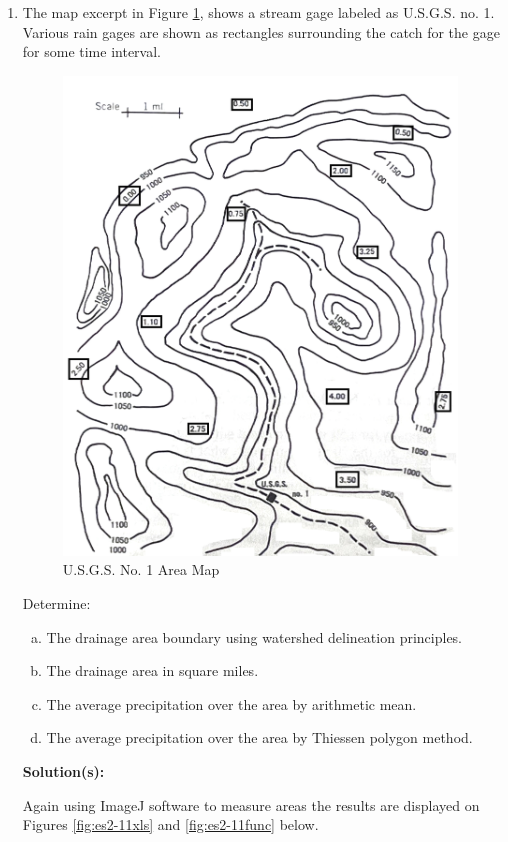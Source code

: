 \documentclass[12pt]{article}
\begin{document}
\begin{enumerate}
\item The map excerpt in Figure \ref{fig:usgsmap}, shows a stream gage labeled as U.S.G.S. no. 1.  Various rain gages are shown as rectangles surrounding the catch for the gage for some time interval.  

\begin{figure}[h!] %
   \centering
   \includegraphics[height=5in]{Map.jpg} 
   \caption{U.S.G.S. No. 1 Area Map}
   \label{fig:usgsmap}
\end{figure}

Determine:
    \begin{enumerate}[a)]
        \item The drainage area boundary using watershed delineation principles.
        \item The drainage area in square miles. 
        \item The average precipitation over the area by arithmetic mean. 
        \item The average precipitation over the area by Thiessen polygon method. 
    \end{enumerate}

\textbf{Solution(s):}

Again using ImageJ software to measure areas the results are displayed on Figures \ref{fig:es2-11xls} and \ref{fig:es2-11func} below.


\end{enumerate}
\end{document}
